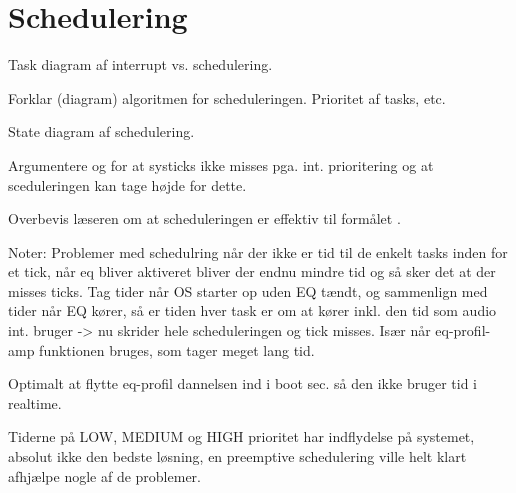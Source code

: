 \section{Schedulering}

Task diagram af interrupt vs. schedulering.

Forklar (diagram) algoritmen for scheduleringen. Prioritet af tasks, etc.

State diagram af schedulering.

Argumentere og for at systicks ikke misses pga. int. prioritering og at sceduleringen kan tage højde for dette.

Overbevis læseren om at scheduleringen er effektiv til formålet .

Noter:
Problemer med schedulring når der ikke er tid til de enkelt tasks inden for et tick, når eq bliver aktiveret bliver der endnu mindre tid og så sker det at der misses ticks.
Tag tider når OS starter op uden EQ tændt, og sammenlign med tider når EQ kører, så er tiden hver task er om at kører inkl. den tid som audio int. bruger -> nu skrider hele scheduleringen og tick misses. Især når eq-profil-amp funktionen bruges, som tager meget lang tid.

Optimalt at flytte eq-profil dannelsen ind i boot sec. så den ikke bruger tid i realtime.

Tiderne på LOW, MEDIUM og HIGH prioritet har indflydelse på systemet, absolut ikke den bedste løsning, en preemptive schedulering ville helt klart afhjælpe nogle af de problemer.




 

